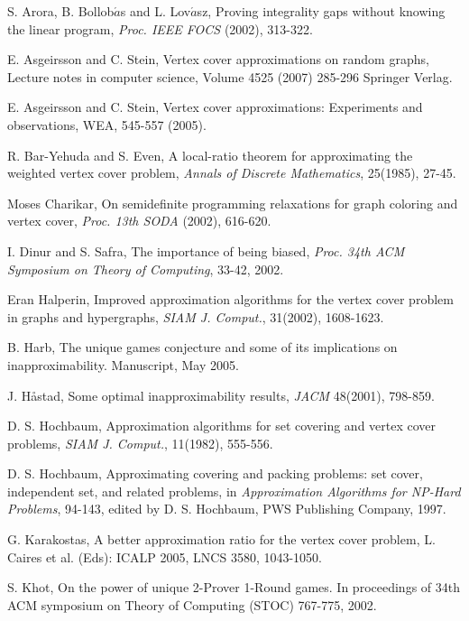 \documentclass[12pt]{article}
\begin{document}
{ \small 

\begin{thebibliography}{999}
 S. Arora, B. Bollob$\acute{a}$s and L.
Lov$\acute{a}$sz, Proving integrality gaps without knowing the
linear program, {\it Proc. IEEE FOCS} (2002), 313-322.

 E. Asgeirsson and C. Stein, Vertex cover approximations on random graphs,
Lecture notes in computer science, Volume 4525 (2007) 285-296
Springer Verlag.

 E. Asgeirsson and C. Stein, Vertex cover
approximations: Experiments and observations, WEA, 545-557 (2005).

 R. Bar-Yehuda and S. Even, A local-ratio theorem for approximating the weighted vertex cover problem,
 {\it Annals of Discrete Mathematics}, 25(1985), 27-45.

 Moses Charikar, On semidefinite programming
relaxations for graph coloring and vertex cover, {\it Proc. 13th
SODA} (2002), 616-620.

 I. Dinur and S. Safra, The importance of being
biased, {\it Proc. 34th ACM Symposium on Theory of Computing},
33-42, 2002.

 Eran Halperin, Improved approximation algorithms for the vertex cover problem
in graphs and hypergraphs, {\it SIAM J. Comput.}, 31(2002),
1608-1623.

 B. Harb, The unique games conjecture and some of its
implications on inapproximability. Manuscript, May 2005.

 J. H{\aa}stad, Some optimal inapproximability results,
{\it JACM} 48(2001), 798-859.

 D. S. Hochbaum, Approximation algorithms for set covering and vertex cover problems,
{\it SIAM J. Comput.}, 11(1982), 555-556.


 D. S. Hochbaum, Approximating covering and packing problems: set cover, independent set,
and related problems, in {\it Approximation Algorithms for NP-Hard
Problems}, 94-143, edited by D. S. Hochbaum, PWS Publishing Company,
1997.

 G. Karakostas, A better approximation ratio for
the vertex cover problem, L. Caires et al. (Eds): ICALP 2005, LNCS
3580, 1043-1050.

 S. Khot, On the power of unique 2-Prover 1-Round
games. In proceedings of 34th ACM symposium on Theory of Computing
(STOC) 767-775, 2002.


\end{thebibliography}}
\end{document}
